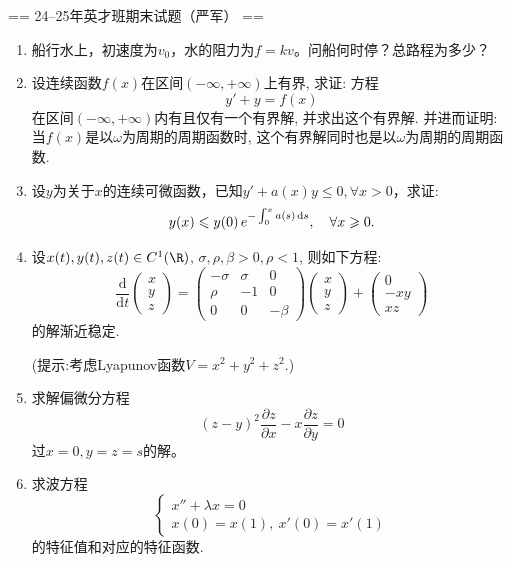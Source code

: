 == 24--25年英才班期末试题（严军） ==
\begin{enumerate}
    \item 船行水上，初速度为$v_0$，水的阻力为$f=kv$。问船何时停？总路程为多少？
    \item 设连续函数$f(x)$在区间$(-\infty, +\infty)$上有界, 求证: 方程
    $$y'+y = f(x)$$
    在区间$(-\infty, +\infty)$内有且仅有一个有界解, 并求出这个有界解. 
    并进而证明: 当$f(x)$是以$\omega$为周期的周期函数时, 
    这个有界解同时也是以$\omega$为周期的周期函数.
    \item 设$y$为关于$x$的连续可微函数，已知$y'+a(x) y \leqslant 0, \forall x > 0$，求证:
    $$y(x) \leqslant y(0) \, e^{-\int_{0}^x a(s)\,{\rm d}s}, \quad \forall x \geqslant 0.$$
    \item 设$x(t), y(t), z(t) \in C^1(\R)$, $\sigma, \rho, \beta > 0, \rho < 1$, 则如下方程:
    $$\frac{\mathrm{d}}{\mathrm{d}t} \begin{pmatrix}x \\y \\z\end{pmatrix} 
    = \begin{pmatrix}
        -\sigma &\sigma &0 \\
        \rho &-1 &0 \\
        0 &0 &-\beta
    \end{pmatrix}
    \begin{pmatrix}x \\y \\z\end{pmatrix} 
     + 
    \begin{pmatrix}0\\-xy\\xz\end{pmatrix}$$
     的解渐近稳定.

     (提示:考虑Lyapunov函数$V = x^2 + y^2 + z^2$.)
     \item 求解偏微分方程
     $$(z-y)^2\frac{\partial z}{\partial x}-x\frac{\partial z}{\partial y}=0$$
     过$x=0,y=z=s$的解。

     \item 求波方程
     $$\begin{cases}
        x'' + \lambda x = 0\\
        x(0) = x(1),\ x'(0) = x'(1)
     \end{cases}$$
     的特征值和对应的特征函数.
\end{enumerate}

